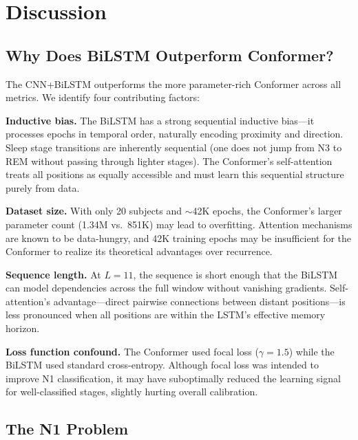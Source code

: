 \documentclass[final]{article}
\begin{document}
\section{Discussion}

\subsection{Why Does BiLSTM Outperform Conformer?}

The CNN+BiLSTM outperforms the more parameter-rich Conformer across all metrics. We identify four contributing factors:

\textbf{Inductive bias.} The BiLSTM has a strong sequential inductive bias---it processes epochs in temporal order, naturally encoding proximity and direction. Sleep stage transitions are inherently sequential (one does not jump from N3 to REM without passing through lighter stages). The Conformer's self-attention treats all positions as equally accessible and must learn this sequential structure purely from data.

\textbf{Dataset size.} With only 20 subjects and $\sim$42K epochs, the Conformer's larger parameter count (1.34M vs.\ 851K) may lead to overfitting. Attention mechanisms are known to be data-hungry, and 42K training epochs may be insufficient for the Conformer to realize its theoretical advantages over recurrence.

\textbf{Sequence length.} At $L = 11$, the sequence is short enough that the BiLSTM can model dependencies across the full window without vanishing gradients. Self-attention's advantage---direct pairwise connections between distant positions---is less pronounced when all positions are within the LSTM's effective memory horizon.

\textbf{Loss function confound.} The Conformer used focal loss ($\gamma = 1.5$) while the BiLSTM used standard cross-entropy. Although focal loss was intended to improve N1 classification, it may have suboptimally reduced the learning signal for well-classified stages, slightly hurting overall calibration.

\subsection{The N1 Problem}
\end{document}
